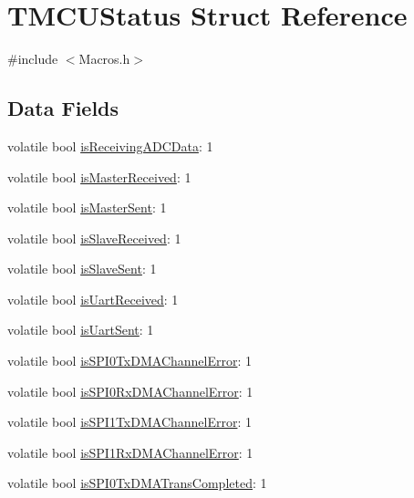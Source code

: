 \hypertarget{struct_t_m_c_u_status}{\section{T\-M\-C\-U\-Status Struct Reference}
\label{struct_t_m_c_u_status}
}


{\ttfamily \#include $<$Macros.\-h$>$}

\subsection*{Data Fields}
\begin{DoxyCompactItemize}
\item 
volatile bool \hyperlink{struct_t_m_c_u_status_a1874f5f942ba06c9a04cf9d80d886c69}{is\-Receiving\-A\-D\-C\-Data}\-: 1
\item 
volatile bool \hyperlink{struct_t_m_c_u_status_a758b50c845375122567c83d5d2ead1ea}{is\-Master\-Received}\-: 1
\item 
volatile bool \hyperlink{struct_t_m_c_u_status_a8c8822fd6c3cd3a66b0c57f7f599084e}{is\-Master\-Sent}\-: 1
\item 
volatile bool \hyperlink{struct_t_m_c_u_status_a93f9e6a2964b9b5d7c8c31ee7f3b418a}{is\-Slave\-Received}\-: 1
\item 
volatile bool \hyperlink{struct_t_m_c_u_status_ad09ebfde33e68b109909147dc08b55fd}{is\-Slave\-Sent}\-: 1
\item 
volatile bool \hyperlink{struct_t_m_c_u_status_a1f1b1e5d16e3423b4dccbc2b045da15b}{is\-Uart\-Received}\-: 1
\item 
volatile bool \hyperlink{struct_t_m_c_u_status_a63eaabcf3e40778712ff5d9a92f68366}{is\-Uart\-Sent}\-: 1
\item 
volatile bool \hyperlink{struct_t_m_c_u_status_af25f8dd705dffec7fff2e6085c0794ed}{is\-S\-P\-I0\-Tx\-D\-M\-A\-Channel\-Error}\-: 1
\item 
volatile bool \hyperlink{struct_t_m_c_u_status_aba5065fea6beb711f6d8ab94af52d98d}{is\-S\-P\-I0\-Rx\-D\-M\-A\-Channel\-Error}\-: 1
\item 
volatile bool \hyperlink{struct_t_m_c_u_status_a8ae581353ceb6e9ef96799da069fb22c}{is\-S\-P\-I1\-Tx\-D\-M\-A\-Channel\-Error}\-: 1
\item 
volatile bool \hyperlink{struct_t_m_c_u_status_ae2b77978e33c0cd9dcf7e83bdaa5eba9}{is\-S\-P\-I1\-Rx\-D\-M\-A\-Channel\-Error}\-: 1
\item 
volatile bool \hyperlink{struct_t_m_c_u_status_a7f5b9e8989d93b19bbd38b01cb042a7f}{is\-S\-P\-I0\-Tx\-D\-M\-A\-Trans\-Completed}\-: 1

\end{DoxyCompactItemize}
